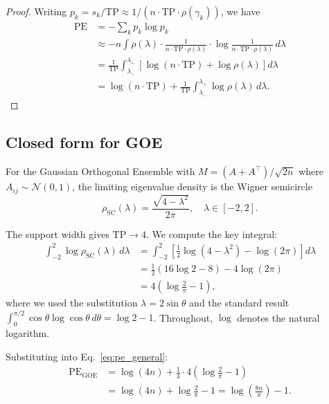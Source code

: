 \documentclass[aps,pre,twocolumn,superscriptaddress,showpacs]{revtex4-2}
\begin{document}
\begin{proof}
Writing $p_k = s_k / \mathrm{TP} \approx 1/(n \cdot \mathrm{TP} \cdot \rho(\gamma_k))$, we have
\begin{align}
\mathrm{PE} &= -\sum_k p_k \log p_k \nonumber \\
&\approx -n \int \rho(\lambda) \cdot \frac{1}{n \cdot \mathrm{TP} \cdot \rho(\lambda)} \cdot \log \frac{1}{n \cdot \mathrm{TP} \cdot \rho(\lambda)}\, d\lambda \nonumber \\
&= \frac{1}{\mathrm{TP}} \int_{\lambda_-}^{\lambda_+} \left[\log(n \cdot \mathrm{TP}) + \log \rho(\lambda)\right] d\lambda \nonumber \\
&= \log(n \cdot \mathrm{TP}) + \frac{1}{\mathrm{TP}} \int_{\lambda_-}^{\lambda_+} \log \rho(\lambda)\, d\lambda.
\end{align}
\end{proof}

\subsection{Closed form for GOE}

For the Gaussian Orthogonal Ensemble with $M = (A + A^\top)/\sqrt{2n}$ where $A_{ij} \sim \mathcal{N}(0, 1)$, the limiting eigenvalue density is the Wigner semicircle~\cite{wigner1955}
\begin{equation}
\rho_{\mathrm{SC}}(\lambda) = \frac{\sqrt{4 - \lambda^2}}{2\pi}, \quad \lambda \in [-2, 2].
\label{eq:semicircle}
\end{equation}

The support width gives $\mathrm{TP} \to 4$. We compute the key integral:
\begin{align}
\int_{-2}^{2} \log \rho_{\mathrm{SC}}(\lambda)\, d\lambda &= \int_{-2}^{2} \left[\tfrac{1}{2}\log(4 - \lambda^2) - \log(2\pi)\right] d\lambda \nonumber \\
&= \tfrac{1}{2}(16 \log 2 - 8) - 4\log(2\pi) \nonumber \\
&= 4\!\left(\log\tfrac{2}{\pi} - 1\right),
\label{eq:integral}
\end{align}
where we used the substitution $\lambda = 2\sin\theta$ and the standard result $\int_0^{\pi/2} \cos\theta \log\cos\theta\, d\theta = \log 2 - 1$. Throughout, $\log$ denotes the natural logarithm.

Substituting into Eq.~\eqref{eq:pe_general}:
\begin{align}
\mathrm{PE}_{\mathrm{GOE}} &= \log(4n) + \tfrac{1}{4} \cdot 4\!\left(\log\tfrac{2}{\pi} - 1\right) \nonumber \\
&= \log(4n) + \log\tfrac{2}{\pi} - 1 = \log\!\left(\frac{8n}{\pi}\right) - 1.
\label{eq:pe_goe_derived}
\end{align}
\end{document}
